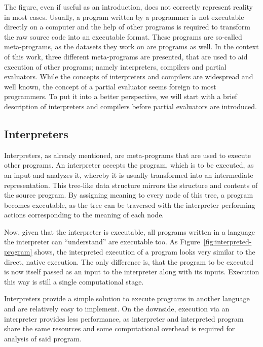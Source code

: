The figure, even if useful as an introduction, does not correctly represent reality in most cases.
Usually, a program written by a programmer is not executable directly on a computer and the help of other programs is required to transform the raw source code into an executable format.
These programs are so-called meta-programs, as the datasets they work on are programs as well.
In the context of this work, three different meta-programs are presented, that are used to aid execution of other programs; namely interpreters, compilers and partial evaluators.
While the concepts of interpreters and compilers are widespread and well known, the concept of a partial evaluator seems foreign to most programmers.
To put it into a better perspective, we will start with a brief description of interpreters and compilers before partial evaluators are introduced.


\subsection{Interpreters}

Interpreters, as already mentioned, are meta-programs that are used to execute other programs.
An interpreter accepts the program, which is to be executed, as an input and analyzes it, whereby it is usually transformed into an intermediate representation.
This tree-like data structure mirrors the structure and contents of the source program.
By assigning meaning to every node of this tree, a program becomes executable, as the tree can be traversed with the interpreter performing actions corresponding to the meaning of each node.

Now, given that the interpreter is executable, all programs written in a language the interpreter can \enquote{understand} are executable too.
As Figure~\ref{fig:interpreted-program} shows, the interpreted execution of a program looks very similar to the direct, native execution.
The only difference is, that the program to be executed is now itself passed as an input to the interpreter along with its inputs.
Execution this way is still a single computational stage.

Interpreters provide a simple solution to execute programs in another language and are relatively easy to implement.
On the downside, execution via an interpreter provides less performance, as interpreter and interpreted program share the same resources and some computational overhead is required for analysis of said program.

